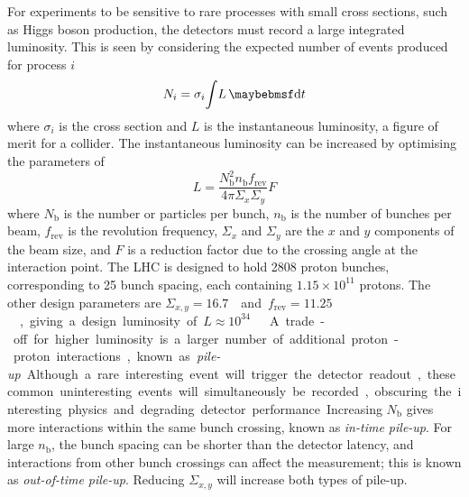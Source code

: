For experiments to be sensitive to rare processes with small cross sections, such as Higgs 
boson production, the detectors must record a large integrated luminosity. This is seen by 
considering the expected number of events produced for process $i$
\begin{equation}
	N_i = \sigma_i \! \int \! L \, \d{t}
	\label{eq:event_rate}
\end{equation}
where $\sigma_i$ is the cross section and $L$ is the instantaneous luminosity, a figure of 
merit for a collider. The instantaneous luminosity can be increased by optimising the
parameters of
\begin{equation}
	L = \frac{N_{\text{b}}^2 n_{\text{b}} f_{\text{rev}}}{4\pi \varSigma_x \varSigma_y} F
	\label{eq:lumi_beam}
\end{equation}
where $N_{\text{b}}$ is the number or particles per bunch, $n_{\text{b}}$ is the number of 
bunches per beam, $f_{\text{rev}}$ is the revolution frequency, $\varSigma_x$ and 
$\varSigma_y$ are the $x$ and $y$ components of the beam size, and $F$ is a reduction 
factor due to the crossing angle at the interaction point. The \ac{LHC} is designed to 
hold 2808 proton bunches, corresponding to \unit{25}{\nano\second} bunch spacing, each 
containing $1.15\times10^{11}$ protons. The other design parameters are 
\unit{$\varSigma_{x,y} = 16.7$}{\micro\metre} and \unit{$f_{\text{rev}} = 11.25$}{\kHz}, 
giving a design luminosity of \unit{$L \approx 10^{34}$}{\lumiunits} \cite{LHC}.

A trade-off for higher luminosity is a larger number of additional proton-proton 
interactions, known as \textit{pile-up}. Although a rare interesting event will trigger 
the detector readout, these common uninteresting events will simultaneously be recorded, 
obscuring the interesting physics and degrading detector performance. Increasing 
$N_{\text{b}}$ gives more interactions within the same bunch crossing, known as 
\textit{in-time pile-up}. For large $n_{\text{b}}$, the bunch spacing can be shorter than 
the detector latency, and interactions from other bunch crossings can affect the 
measurement; this is known as \textit{out-of-time pile-up}. Reducing $\varSigma_{x,y}$ 
will increase both types of pile-up.
